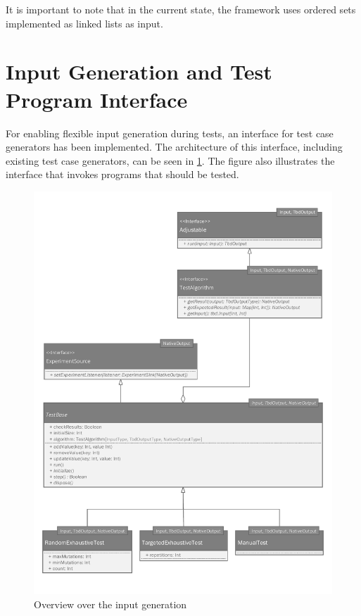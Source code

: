 It is important to note that in the current state, the framework uses ordered sets implemented as linked lists as input.

\section{Input Generation and Test Program Interface}

For enabling flexible input generation during tests, an interface for test case generators has been implemented. The architecture of this interface, including existing test case generators, can be seen in \ref{fig:input_generation}. The figure also illustrates the interface that invokes programs that should be tested. 

\begin{figure}
\begin{center}
\includegraphics[scale=0.7]{uml/TestBase.pdf}
\end{center}
\caption{Overview over the input generation}
\label{fig:input_generation}
\end{figure}

